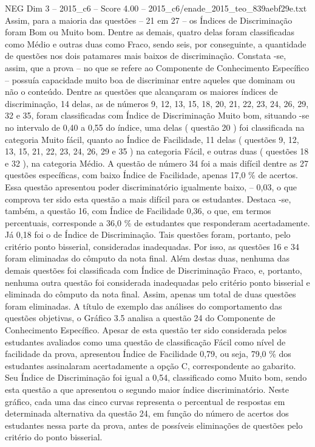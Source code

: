 \begin{textsample}{NEG Dim 3 – 2015\_c6 – Score 4.00 – 2015\_c6/enade\_2015\_teo\_839aebf29e.txt}
Assim, para a maioria das questões – 21 em 27 – os Índices de Discriminação foram Bom ou Muito bom.
Dentre as demais, quatro delas foram classificadas como Médio e outras duas como Fraco, sendo seis, por conseguinte, a quantidade de questões nos dois patamares mais baixos de discriminação.
Constata -se, assim, que a prova – no que se refere ao Componente de Conhecimento Específico – possuía capacidade muito boa de discriminar entre aqueles que dominam ou não o conteúdo.
Dentre as questões que alcançaram os maiores índices de discriminação, 14 delas, as de números 9, 12, 13, 15, 18, 20, 21, 22, 23, 24, 26, 29, 32 e 35, foram classificadas com Índice de Discriminação Muito bom, situando -se no intervalo de 0,40 a 0,55 do índice, uma delas ( questão 20 ) foi classificada na categoria Muito fácil, quanto ao Índice de Facilidade, 11 delas ( questões 9, 12, 13, 15, 21, 22, 23, 24, 26, 29 e 35 ) na categoria Fácil, e outras duas ( questões 18 e 32 ), na categoria Médio.
A questão de número 34 foi a mais difícil dentre as 27 questões específicas, com baixo Índice de Facilidade, apenas 17,0 \% de acertos.
Essa questão apresentou poder discriminatório igualmente baixo, – 0,03, o que comprova ter sido esta questão a mais difícil para os estudantes.
Destaca -se, também, a questão 16, com Índice de Facilidade 0,36, o que, em termos percentuais, corresponde a 36,0 \% de estudantes que responderam acertadamente.
Já 0,18 foi o de Índice de Discriminação.
Tais questões foram, portanto, pelo critério ponto bisserial, consideradas inadequadas.
Por isso, as questões 16 e 34 foram eliminadas do cômputo da nota final.
Além destas duas, nenhuma das demais questões foi classificada com Índice de Discriminação Fraco, e, portanto, nenhuma outra questão foi considerada inadequadas pelo critério ponto bisserial e eliminada do cômputo da nota final.
Assim, apenas um total de duas questões foram eliminadas.
A título de exemplo das análises do comportamento das questões objetivas, o Gráfico 3.5 analisa a questão 24 do Componente de Conhecimento Específico.
Apesar de esta questão ter sido considerada pelos estudantes avaliados como uma questão de classificação Fácil como nível de facilidade da prova, apresentou Índice de Facilidade 0,79, ou seja, 79,0 \% dos estudantes assinalaram acertadamente a opção C, correspondente ao gabarito.
Seu Índice de Discriminação foi igual a 0,54, classificado como Muito bom, sendo esta questão a que apresentou o segundo maior índice discriminatório.
Neste gráfico, cada uma das cinco curvas representa o percentual de respostas em determinada alternativa da questão 24, em função do número de acertos dos estudantes nessa parte da prova, antes de possíveis eliminações de questões pelo critério do ponto bisserial.

\end{textsample}
